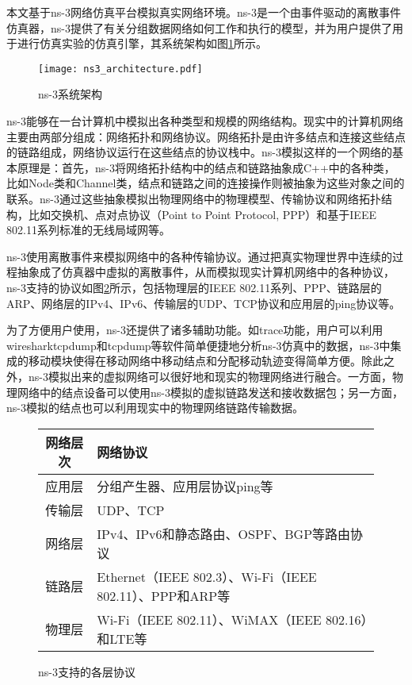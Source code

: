 
本文基于ns-3网络仿真平台模拟真实网络环境。ns-3是一个由事件驱动的离散事件仿真器，ns-3提供了有关分组数据网络如何工作和执行的模型，并为用户提供了用于进行仿真实验的仿真引擎\cite{ns-3,matthias2010ns3,ru2017ns3}，其系统架构如图\ref{fig:c2:ns3 architecture}所示。

\begin{figure}[H]
  \centering
  \texttt{[image: ns3\_architecture.pdf]}
  \caption{ns-3系统架构}
  \label{fig:c2:ns3 architecture}
\end{figure}

ns-3能够在一台计算机中模拟出各种类型和规模的网络结构。现实中的计算机网络主要由两部分组成：网络拓扑和网络协议。网络拓扑是由许多结点和连接这些结点的链路组成，网络协议运行在这些结点的协议栈中。ns-3模拟这样的一个网络的基本原理是：首先，ns-3将网络拓扑结构中的结点和链路抽象成C++中的各种类，比如Node类和Channel类，结点和链路之间的连接操作则被抽象为这些对象之间的联系。ns-3通过这些抽象模拟出物理网络中的物理模型、传输协议和网络拓扑结构，比如交换机、点对点协议（Point to Point Protocol, PPP）和基于IEEE 802.11系列标准的无线局域网等。

ns-3使用离散事件来模拟网络中的各种传输协议。通过把真实物理世界中连续的过程抽象成了仿真器中虚拟的离散事件，从而模拟现实计算机网络中的各种协议，ns-3支持的协议如图\ref{fig:c2:protocols supported in ns-3}所示，包括物理层的IEEE 802.11系列、PPP、链路层的ARP、网络层的IPv4、IPv6、传输层的UDP、TCP协议和应用层的ping协议等。

为了方便用户使用，ns-3还提供了诸多辅助功能。如trace功能，用户可以利用wiresharktcpdump和tcpdump等软件简单便捷地分析ns-3仿真中的数据，ns-3中集成的移动模块使得在移动网络中移动结点和分配移动轨迹变得简单方便。除此之外，ns-3模拟出来的虚拟网络可以很好地和现实的物理网络进行融合。一方面，物理网络中的结点设备可以使用ns-3模拟的虚拟链路发送和接收数据包；另一方面，ns-3模拟的结点也可以利用现实中的物理网络链路传输数据。

\begin{figure}[H]
  \begin{table}[H]
      \begin{tabularx}{\textwidth}{cY}
      \toprule
          网络层次 & 网络协议 \\
      \midrule
          应用层 & 分组产生器、应用层协议ping等 \\
          传输层 & UDP、TCP \\
          网络层 & IPv4、IPv6和静态路由、OSPF、BGP等路由协议 \\
          链路层 & Ethernet（IEEE 802.3）、Wi-Fi（IEEE 802.11）、PPP和ARP等 \\
          物理层 & Wi-Fi（IEEE 802.11）、WiMAX（IEEE 802.16）和LTE等 \\
      \bottomrule
      \end{tabularx}
  \end{table}
  \caption{ns-3支持的各层协议}
  \label{fig:c2:protocols supported in ns-3}
\end{figure}

